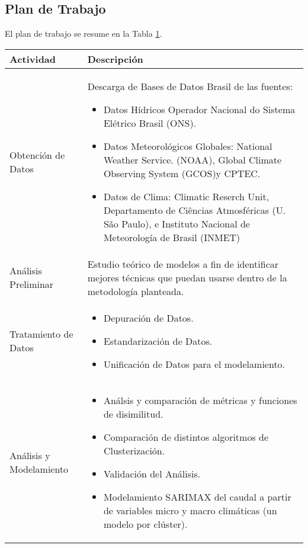 \documentclass[10pt,a4paper]{article}
\begin{document}

\subsection{Plan de Trabajo}

El plan de trabajo se resume en la Tabla \ref{TablaPlan}.

\begin{table}[h!]
\centering

\label{TablaPlan}
\begin{tabular}{|m{4cm}|p{10cm}|}
\hline
Actividad  & Descripción  \\ \hline

Obtención de Datos &  

Descarga de Bases de Datos Brasil de las fuentes: 

\begin{itemize}

\item Datos Hídricos Operador Nacional do Sistema Elétrico Brasil (ONS).
\item Datos Meteorológicos Globales: National Weather Service. (NOAA), Global Climate Observing System (GCOS)y CPTEC.
\item Datos de Clima: Climatic Reserch Unit, Departamento de Ciências Atmosféricas (U. São Paulo), e Instituto Nacional de Meteorología de Brasil (INMET)
\end{itemize}

\\ \hline


Análisis Preliminar &  Estudio teórico de modelos a fin de identificar mejores técnicas que puedan usarse dentro de la metodología planteada.
\\ \hline


Tratamiento de Datos &  

\begin{itemize}
\item Depuración de Datos.
\item Estandarización de Datos.
\item Unificación de Datos para el modelamiento.
\end{itemize}

\\ \hline


Análisis y Modelamiento &   

\begin{itemize}
\item Análsis y comparación de métricas y funciones de disimilitud.
\item Comparación de distintos algoritmos de Clusterización.
\item Validación del Análisis.
\item Modelamiento SARIMAX del caudal a partir de variables micro y macro climáticas (un modelo por clúster).
\end{itemize}


\end{tabular}
\end{table}
\end{document}
